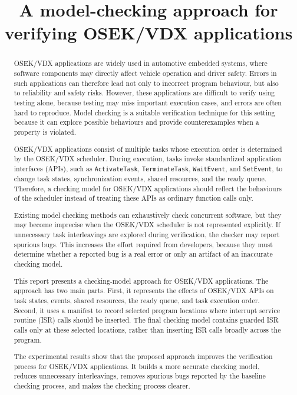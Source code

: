 \documentclass[11pt]{article}
\title{A model-checking approach for verifying OSEK/VDX applications}
\author{}
\begin{document}
\maketitle

\begin{abstract}

OSEK/VDX applications are widely used in automotive embedded systems, where software components may directly affect vehicle operation and driver safety. Errors in such applications can therefore lead not only to incorrect program behaviour, but also to reliability and safety risks. However, these applications are difficult to verify using testing alone, because testing may miss important execution cases, and errors are often hard to reproduce. Model checking is a suitable verification technique for this setting because it can explore possible behaviours and provide counterexamples when a property is violated.

OSEK/VDX applications consist of multiple tasks whose execution order is determined by the OSEK/VDX scheduler. During execution, tasks invoke standardized application interfaces (APIs), such as \texttt{ActivateTask}, \texttt{TerminateTask}, \texttt{WaitEvent}, and \texttt{SetEvent}, to change task states, synchronization events, shared resources, and the ready queue. Therefore, a checking model for OSEK/VDX applications should reflect the behaviours of the scheduler instead of treating these APIs as ordinary function calls only.

Existing model checking methods can exhaustively check concurrent software, but they may become imprecise when the OSEK/VDX scheduler is not represented explicitly. If unnecessary task interleavings are explored during verification, the checker may report spurious bugs. This increases the effort required from developers, because they must determine whether a reported bug is a real error or only an artifact of an inaccurate checking model.

This report presents a checking-model approach for OSEK/VDX applications. The approach has two main parts. First, it represents the effects of OSEK/VDX APIs on task states, events, shared resources, the ready queue, and task execution order. Second, it uses a manifest to record selected program locations where interrupt service routine (ISR) calls should be inserted. The final checking model contains guarded ISR calls only at these selected locations, rather than inserting ISR calls broadly across the program.

The experimental results show that the proposed approach improves the verification process for OSEK/VDX applications. It builds a more accurate checking model, reduces unnecessary interleavings, removes spurious bugs reported by the baseline checking process, and makes the checking process clearer.

\end{abstract}

\newpage





\newpage




\newpage

\printbibliography
    
\end{document}
